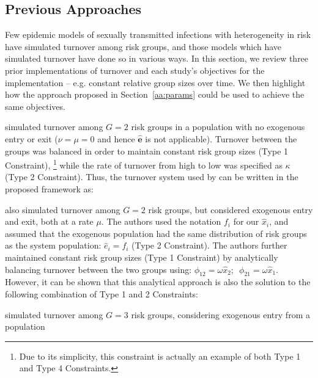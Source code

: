 \subsection{Previous Approaches}
\label{aa:prev-appr}
Few epidemic models of sexually transmitted infections
with heterogeneity in risk
have simulated turnover among risk groups,
and those models which have simulated turnover
have done so in various ways.
In this section, we review
three prior implementations of turnover and each study's objectives for the implementation
-- e.g. constant relative group sizes over time.
We then highlight how the approach proposed in Section~\ref{aa:params}
could be used to achieve the same objectives.
\par
\citet{Stigum1994} simulated turnover among $G = 2$ risk groups
in a population with no exogenous entry or exit
($\nu = \mu = 0$ and hence $\bm{\hat{e}}$ is not applicable).
Turnover between the groups was balanced
in order to maintain constant risk group sizes (Type 1 Constraint),%
\footnote{Due to its simplicity,
  this constraint is actually an example of both Type 1 and Type 4 Constraints.}
while the rate of turnover from high to low
was specified as $\kappa$ (Type 2 Constraint).
Thus, the turnover system used by \citet{Stigum1994} can be written
in the proposed framework as:

\par
\citet{Henry2015} also simulated turnover among $G = 2$ risk groups,
but considered exogenous entry and exit, both at a rate $\mu$.
The authors used the notation $f_i$ for our $\hat{x}_i$, and assumed that
the exogenous population had the same distribution of risk groups
as the system population: $\hat{e}_i = f_i$ (Type 2 Constraint).
The authors further maintained constant risk group sizes (Type 1 Constraint)
by analytically balancing turnover between the two groups using:
$\phi_{12} = \omega \hat{x}_2 ;\enspace \phi_{21} = \omega \hat{x}_1$.
However, it can be shown that this analytical approach
is also the solution to the following combination of Type 1 and 2 Constraints:

\par
\citet{Eaton2014} simulated turnover among $G = 3$ risk groups,
considering exogenous entry from a population
